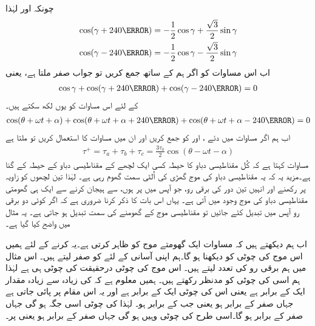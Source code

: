چونکہ  اور  لہٰذا
\begin{align*}
\cos (\gamma+240\degree)&=-\frac{1}{2}\cos \gamma +\frac{\sqrt{3}}{2}\sin \gamma\\
\cos (\gamma-240\degree)&=-\frac{1}{2}\cos \gamma -\frac{\sqrt{3}}{2}\sin \gamma
\end{align*}
اب اس مساوات کو اگر ہم   کے ساتھ جمع کریں تو جواب صفر ملتا ہے، یعنی
\begin{align*}
\cos \gamma +\cos (\gamma+240\degree)+\cos (\gamma-240\degree)=0
\end{align*}
 کے لئے اس مساوات کو یوں لکھ سکتے ہیں۔
\begin{align}\label{مساوات_تبادلہ_تین_سمتیات_جمع_صفر}
\cos (\theta +\omega t +\alpha) +\cos (\theta +\omega t +\alpha+240\degree)+\cos (\theta+\omega t +\alpha-240\degree)=0
\end{align}
اب ہم  اگر مساوات   میں دئے   ،  اور   کو جمع کریں اور ان میں مساوات   کا استعمال کریں تو ملتا ہے
\begin{align}\label{مساوات_تبادلہ_گھومتا_موج}
\tau^+=\tau_a+\tau_b+\tau_c=\frac{3 \tau_0}{2} \cos (\theta -\omega t -\alpha)
\end{align}
مساوات  کہتا ہے کہ کُل مقناطیسی دباو کا حیطہ کسی ایک لچھے کے مقناطیسی دباو کے حیطہ کے  گنا ہے۔مزید یہ کہ یہ مقناطیسی دباو کی موج گھڑی کی اُلٹی سمت گھوم رہی ہے۔ لہٰذا تین لچھوں کو   زاویہ پر رکھنے اور انہیں تین دور کی برقی رو، جو آپس میں  پر ہوں،  سے  ہیجان کرنے سے ایک ہی گھومتی مقناطیسی دباو کی موج وجود میں آتی ہے۔ یہاں اس بات کا ذکر کرنا ضروری ہے کہ اگر کوئی دو برقی رو آپس میں تبدیل کئے جائیں تو مقناطیسی موج کے گھومنے کی سمت تبدیل ہو جاتی ہے۔  یہ مثال میں واضح کیا گیا ہے۔

اب ہم دیکھتے ہیں کہ مساوات  ایک گھومتے موج کو ظاہر کرتی ہے۔یہ کرنے کے لئے ہمیں اس موج کی چوٹی کو دیکھنا ہو گا۔ہم اپنی آسانی کے لئے   کو صفر لیتے ہیں۔ اس مثال میں ہم برقی رو کی تعدد   لیتے ہیں۔ اس موج کی چوٹی درحقیقت  کی چوٹی ہی ہے لہٰذا ہم اسی کی چوٹی کو مدنظر رکھتے ہیں۔ ہمیں معلوم ہے کہ  کی زیادہ سے زیادہ مقدار ایک کے برابر ہے یعنی اس کی چوٹی ایک کے برابر ہے اور یہ اس مقام پر پائی جاتی ہے جہاں  صفر کے برابر ہو یعنی جب  کے برابر ہو۔ لہٰذا  کی چوٹی اسی جگہ ہو گی جہاں  صفر کے برابر ہو گا۔اسی طرح  کی چوٹی وہیں ہو گی جہاں  صفر کے برابر ہو یعنی  پر۔

